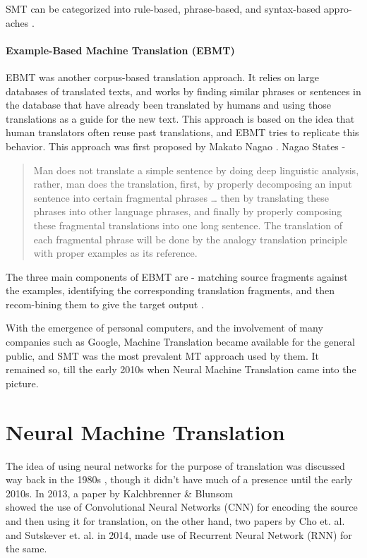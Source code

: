 SMT can be categorized into rule-based, phrase-based, and syntax-based appro-aches \cite{yang2014statistical}.

\paragraph{Example-Based Machine Translation (EBMT)}

EBMT was another corpus-based translation approach. It relies on large databases of translated texts, and works by finding similar phrases or sentences in the database that have already been translated by humans and using those translations as a guide for the new text. This approach is based on the idea that human translators often reuse past translations, and EBMT tries to replicate this behavior. This approach was first proposed by Makato Nagao \cite{nagao1984framework}. Nagao States -

\begin{quote}
    Man does not translate a simple sentence by doing deep linguistic analysis, rather, man does the translation, first, by properly decomposing an input sentence into certain fragmental phrases … then by translating these phrases into other language phrases, and finally by properly composing these fragmental translations into one long sentence. The translation of each fragmental phrase will be done by the analogy translation principle with proper examples as its reference.
\end{quote}

The three main components of EBMT are - matching source fragments against the examples, identifying the corresponding translation fragments, and then recom-bining them to give the target output \cite{wong2023example}.

With the emergence of personal computers, and the involvement of many companies such as Google, Machine Translation became available for the general public, and SMT was the most prevalent MT approach used by them. It remained so, till the early 2010s when Neural Machine Translation came into the picture.

\section{Neural Machine Translation}

The idea of using neural networks for the purpose of translation was discussed way back in the 1980s \cite{allen1987several}, though it didn't have much of a presence until the early 2010s. In 2013, a paper by Kalchbrenner \& Blunsom \\ \cite{kalchbrenner2013recurrent} showed the use of Convolutional Neural Networks (CNN) for encoding the source and then using it for translation, on the other hand, two papers by Cho et. al. \cite{cho2014learning} and Sutskever et. al. \cite{sutskever2014sequence} in 2014, made use of Recurrent Neural Network (RNN) for the same. 


